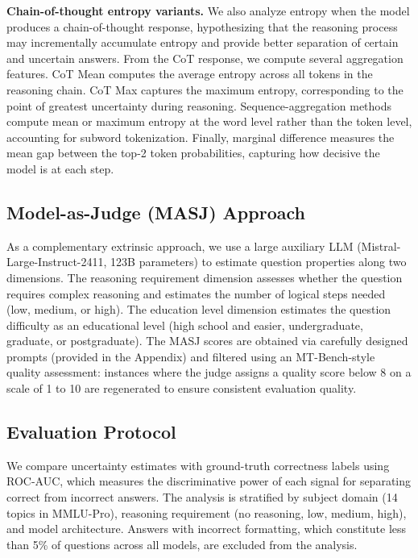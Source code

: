 \textbf{Chain-of-thought entropy variants.} We also analyze entropy when the model produces a chain-of-thought response, hypothesizing that the reasoning process may incrementally accumulate entropy and provide better separation of certain and uncertain answers. From the CoT response, we compute several aggregation features. CoT Mean computes the average entropy across all tokens in the reasoning chain. CoT Max captures the maximum entropy, corresponding to the point of greatest uncertainty during reasoning. Sequence-aggregation methods compute mean or maximum entropy at the word level rather than the token level, accounting for subword tokenization. Finally, marginal difference measures the mean gap between the top-2 token probabilities, capturing how decisive the model is at each step.

\subsection{Model-as-Judge (MASJ) Approach}

As a complementary extrinsic approach, we use a large auxiliary LLM (Mistral-Large-Instruct-2411, 123B parameters) to estimate question properties along two dimensions. The reasoning requirement dimension assesses whether the question requires complex reasoning and estimates the number of logical steps needed (low, medium, or high). The education level dimension estimates the question difficulty as an educational level (high school and easier, undergraduate, graduate, or postgraduate). The MASJ scores are obtained via carefully designed prompts (provided in the Appendix) and filtered using an MT-Bench-style quality assessment: instances where the judge assigns a quality score below 8 on a scale of 1 to 10 are regenerated to ensure consistent evaluation quality.

\subsection{Evaluation Protocol}

We compare uncertainty estimates with ground-truth correctness labels using ROC-AUC, which measures the discriminative power of each signal for separating correct from incorrect answers. The analysis is stratified by subject domain (14 topics in MMLU-Pro), reasoning requirement (no reasoning, low, medium, high), and model architecture. Answers with incorrect formatting, which constitute less than 5\% of questions across all models, are excluded from the analysis.

